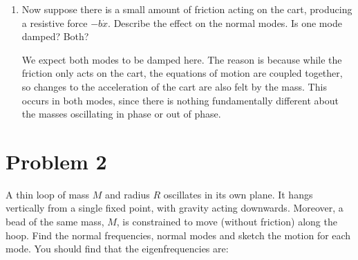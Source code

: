 \documentclass[10pt]{article}
\begin{document}
\begin{enumerate}[label=\alph*)]
\begin{solution}
$$\begin{tikzpicture}
{                        \shade[ball color=gray!70] (\coord,-1.5) circle (0.15cm);
                        \draw[thick] (\coord,-1.5) circle (0.15cm);
                        \draw[ultra thick, -stealth, blue!70] (2.55+\shift,0.85) -- (1.65+\shift,0.85);
                        \draw[ultra thick, -stealth, red!70] (3.65+\shift,0.4125) -- (4.5+\shift,0.4125);
                        \draw[ultra thick, -stealth, \icolor] (\coord-0.3,-1.5) -- (\coord-1.2,-1.5);
                        \draw[ultra thick, -stealth, \fcolor] (\coord+0.3,-1.5) -- (\coord+1.2,-1.5);
                    }
                \end{tikzpicture}$$
			\end{solution}
		\item Now suppose there is a small amount of friction acting on the cart, producing a resistive force
			$-b\dot x$. Describe the effect on the normal modes. Is one mode damped? Both?

			\begin{solution}
				We expect both modes to be damped here. The reason is because while the friction only acts on
				the cart, the equations of motion are coupled together, so changes to the acceleration of the 
				cart are also felt by the mass. This occurs in both modes, since there is nothing fundamentally
				different about the masses oscillating in phase or out of phase. 
			\end{solution}
	\end{enumerate}
	\pagebreak
	\section*{Problem 2}

	A thin loop of mass $M$ and radius $R$ oscillates in its own plane. It hangs vertically from a single fixed
	point,
	with gravity acting downwards. Moreover, a bead of the same mass, $M$, is constrained to move (without 
	friction) along the hoop. Find the normal frequencies, normal modes and sketch the motion for each mode. 
	You should find that the eigenfrequencies are: 
\end{document}
